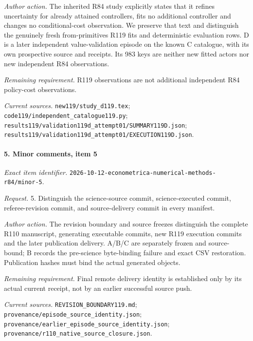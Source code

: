 \par\emph{Author action.} The inherited R84 study explicitly states that it refines uncertainty for already attained controllers, fits no additional controller and changes no conditional-cost observation. We preserve that text and distinguish the genuinely fresh from-primitives R119 fits and deterministic evaluation rows. D is a later independent value-validation episode on the known C catalogue, with its own prospective source and receipts. Its 983 keys are neither new fitted actors nor new independent R84 observations.

\par\emph{Remaining requirement.} R119 observations are not additional independent R84 policy-cost observations.

\par\emph{Current sources.} \nolinkurl{new119/study_d119.tex}; \nolinkurl{code119/independent_catalogue119.py}; \nolinkurl{results119/validation119d_attempt01/SUMMARY119D.json}; \nolinkurl{results119/validation119d_attempt01/EXECUTION119D.json}.

\paragraph{5. Minor comments, item 5}

\emph{Exact item identifier.} \nolinkurl{2026-10-12-econometrica-numerical-methods-r84/minor-5}.

\par\emph{Request.} 5. Distinguish the science-source commit, science-executed commit, referee-revision commit, and source-delivery commit in every manifest.

\par\emph{Author action.} The revision boundary and source freezes distinguish the complete R110 manuscript, generating executable commits, new R119 execution commits and the later publication delivery. A/\allowbreak{}B/\allowbreak{}C are separately frozen and source-bound; B records the pre-science byte-binding failure and exact CSV restoration. Publication hashes must bind the actual generated objects.

\par\emph{Remaining requirement.} Final remote delivery identity is established only by its actual current receipt, not by an earlier successful source push.

\par\emph{Current sources.} \nolinkurl{REVISION_BOUNDARY119.md}; \nolinkurl{provenance/episode_source_identity.json}; \nolinkurl{provenance/earlier_episode_source_identity.json}; \nolinkurl{provenance/r110_native_source_closure.json}.

